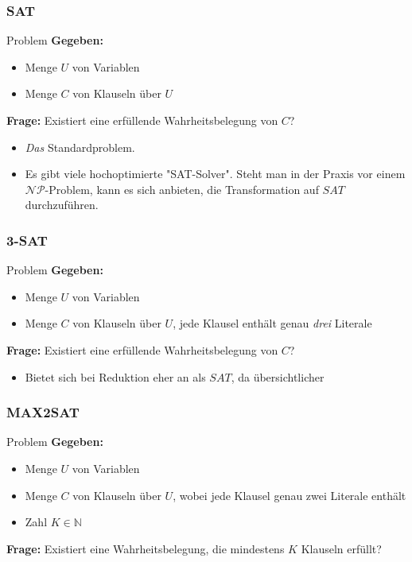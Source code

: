 \documentclass{beamer}
\begin{document}
{\begin{frame}
\frametitle{SAT}
\begin{block}{Problem}
\textbf{Gegeben:}
\begin{itemize}
 \item Menge $U$ von Variablen
 \item Menge $C$ von Klauseln über $U$
\end{itemize}
\textbf{Frage:} Existiert eine erfüllende Wahrheitsbelegung von $C$?
\end{block}
\begin{itemize}
\item \emph{Das} Standardproblem.
\item Es gibt viele hochoptimierte "SAT-Solver". Steht man in der Praxis vor einem $\mathcal{NP}$-Problem, kann es sich anbieten, die Transformation auf $SAT$ durchzuführen.
\end{itemize}
\end{frame}
\begin{frame}
\frametitle{3-SAT}
\begin{block}{Problem}
\textbf{Gegeben:}
\begin{itemize}
 \item Menge $U$ von Variablen
 \item Menge $C$ von Klauseln über $U$, jede Klausel enthält genau \emph{drei} Literale
\end{itemize}
\textbf{Frage:} Existiert eine erfüllende Wahrheitsbelegung von $C$?
\end{block}
\begin{itemize}
\item Bietet sich bei Reduktion eher an als $SAT$, da übersichtlicher
\end{itemize}
\end{frame}
\begin{frame}
\frametitle{MAX2SAT}
\begin{block}{Problem}
\textbf{Gegeben:}
\begin{itemize}
 \item Menge $U$ von Variablen
 \item Menge $C$ von Klauseln über $U$, wobei jede Klausel genau zwei Literale enthält
 \item Zahl $K \in \mathbb{N}$
\end{itemize}
\textbf{Frage:} Existiert eine Wahrheitsbelegung, die mindestens $K$ Klauseln erfüllt?
\end{block}
\end{frame}
\begin{frame}

\end{frame}}
\end{document}
